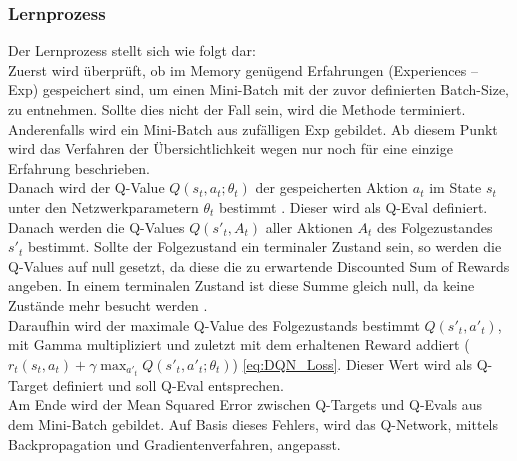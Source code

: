 \subsubsection{Lernprozess} \label{subsubsec:Konzept_Lernprozess_DQN}
Der Lernprozess stellt sich wie folgt dar:\\
Zuerst wird überprüft, ob im Memory genügend Erfahrungen (Experiences -- Exp) gespeichert sind, um einen Mini-Batch mit der zuvor definierten Batch-Size, zu entnehmen. Sollte dies nicht der Fall sein, wird die Methode terminiert. Anderenfalls wird ein Mini-Batch aus zufälligen Exp gebildet. Ab diesem Punkt wird das Verfahren der Übersichtlichkeit wegen nur noch für eine einzige Erfahrung beschrieben.\\
Danach wird der Q-Value $Q(s_t,a_t;\theta_t)$ der gespeicherten Aktion $a_t$ im State $s_t$ unter den Netzwerkparametern $\theta_t$ bestimmt . Dieser wird als Q-Eval definiert.\\
Danach werden die Q-Values $Q(s'_t,A_t)$ aller Aktionen $A_t$ des Folgezustandes $s'_t$  bestimmt. Sollte der Folgezustand ein terminaler Zustand sein, so werden die Q-Values auf null gesetzt, da diese die zu erwartende Discounted Sum of Rewards angeben. In einem terminalen Zustand ist diese Summe gleich null, da keine Zustände mehr besucht werden .\\
Daraufhin wird der maximale Q-Value des Folgezustands bestimmt $Q(s'_t,a'_t)$, mit Gamma multipliziert und zuletzt mit dem erhaltenen Reward addiert ($r_t(s_t,a_t) + \gamma \max_{a'_t}Q(s'_t,a'_t;\theta_t)$) \autoref{eq:DQN_Loss}. Dieser Wert wird als Q-Target definiert und soll Q-Eval entsprechen.\\
Am Ende wird der Mean Squared Error zwischen Q-Targets und Q-Evals aus dem Mini-Batch gebildet. Auf Basis dieses Fehlers, wird das Q-Network, mittels Backpropagation und Gradientenverfahren, angepasst.


